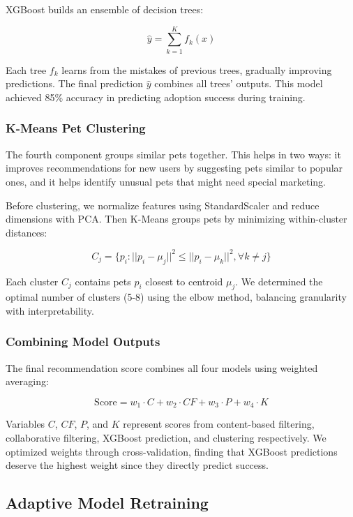 \documentclass[conference]{IEEEtran}
\begin{document}
XGBoost builds an ensemble of decision trees:

\begin{equation}
\hat{y} = \sum_{k=1}^{K} f_k(x)
\end{equation}

Each tree $f_k$ learns from the mistakes of previous trees, gradually improving predictions. The final prediction $\hat{y}$ combines all trees' outputs. This model achieved 85\% accuracy in predicting adoption success during training.

\subsubsection{K-Means Pet Clustering}
The fourth component groups similar pets together. This helps in two ways: it improves recommendations for new users by suggesting pets similar to popular ones, and it helps identify unusual pets that might need special marketing.

Before clustering, we normalize features using StandardScaler and reduce dimensions with PCA. Then K-Means groups pets by minimizing within-cluster distances:

\begin{equation}
C_j = \{p_i : ||p_i - \mu_j||^2 \leq ||p_i - \mu_k||^2, \forall k \neq j\}
\end{equation}

Each cluster $C_j$ contains pets $p_i$ closest to centroid $\mu_j$. We determined the optimal number of clusters (5-8) using the elbow method, balancing granularity with interpretability.

\subsubsection{Combining Model Outputs}
The final recommendation score combines all four models using weighted averaging:

\begin{equation}
\text{Score} = w_1 \cdot C + w_2 \cdot CF + w_3 \cdot P + w_4 \cdot K
\end{equation}

Variables $C$, $CF$, $P$, and $K$ represent scores from content-based filtering, collaborative filtering, XGBoost prediction, and clustering respectively. We optimized weights through cross-validation, finding that XGBoost predictions deserve the highest weight since they directly predict success.

\subsection{Adaptive Model Retraining}
\end{document}
